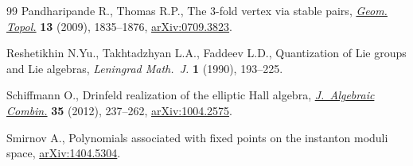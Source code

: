 \begin{thebibliography}{99}
Pandharipande R., Thomas R.P., The 3-fold vertex via stable pairs,
 \href{https://doi.org/10.2140/gt.2009.13.1835}{\textit{Geom. Topol.}} \textbf{13} (2009), 1835--1876, \href{https://arxiv.org/abs/0709.3823}{arXiv:0709.3823}.

Reshetikhin N.{\relax Yu}., Takhtadzhyan L.A., Faddeev L.D., Quantization of
 {L}ie groups and {L}ie algebras, \textit{Leningrad Math.~J.} \textbf{1}
 (1990), 193--225.

Schiffmann O., Drinfeld realization of the elliptic {H}all algebra,
 \href{https://doi.org/10.1007/s10801-011-0302-8}{\textit{J.~Algebraic Combin.}} \textbf{35} (2012), 237--262,
 \href{https://arxiv.org/abs/1004.2575}{arXiv:1004.2575}.

Smirnov A., Polynomials associated with fixed points on the instanton moduli
 space, \href{https://arxiv.org/abs/1404.5304}{arXiv:1404.5304}.

\end{thebibliography}\LastPageEnding
